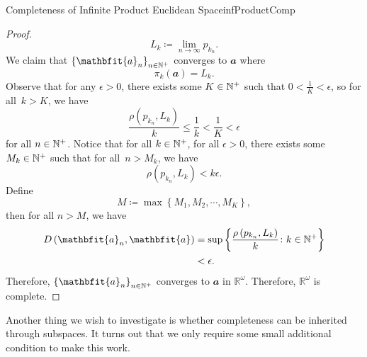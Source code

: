 \documentclass[math]{amznotes}
\theoremstyle{remark}
\begin{document}
\begin{probox}{Completeness of Infinite Product Euclidean Space}{infProductComp}
\begin{proof}
        \begin{equation*}
            L_k \coloneqq \lim_{n \to \infty}p_{k_n}.
        \end{equation*}
        We claim that $\left\{\mathbfit{a}_n\right\}_{n \in \N^+}$ converges to $\mathbfit{a}$ where
        \begin{equation*}
            \pi_k\left(\mathbfit{a}\right) = L_k. 
        \end{equation*}
        Observe that for any $\epsilon > 0$, there exists some $K \in \mathbb{N}^+$ such that $0 < \frac{1}{K} < \epsilon$, so for all~$k > K$, we have 
        \begin{equation*}
            \frac{\rho\left(p_{k_n}, L_k\right)}{k} \leq \frac{1}{k} < \frac{1}{K} < \epsilon
        \end{equation*}
        for all $n \in \mathbb{N}^+$. Notice that for all $k \in \mathbb{N}^+$, for all $\epsilon > 0$, there exists some $M_k \in \mathbb{N}^+$ such that for all~$n > M_k$, we have 
        \begin{equation*}
            \rho\left(p_{k_n}, L_k\right) < k\epsilon.
        \end{equation*}
        Define 
        \begin{equation*}
            M \coloneqq \max\left\{M_1, M_2, \cdots, M_K\right\},
        \end{equation*}
        then for all $n > M$, we have 
        \begin{align*}
            D\left(\mathbfit{a}_n, \mathbfit{a}\right) & = \sup\left\{\frac{\rho\left(p_{k_n}, L_k\right)}{k} \colon k \in \N^+\right\} \\
            & < \epsilon.
        \end{align*}
        Therefore, $\left\{\mathbfit{a}_n\right\}_{n \in \N^+}$ converges to $\mathbfit{a}$ in $\mathbb{R}^{\omega}$. Therefore, $\mathbb{R}^{\omega}$ is complete.
    \end{proof}
\end{probox}
Another thing we wish to investigate is whether completeness can be inherited through subspaces. It turns out that we only require some small additional condition to make this work.
\end{document}
